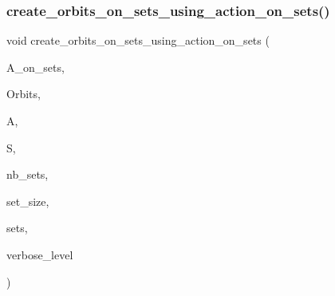 \subsubsection{\texorpdfstring{create\+\_\+orbits\+\_\+on\+\_\+sets\+\_\+using\+\_\+action\+\_\+on\+\_\+sets()}{create\_orbits\_on\_sets\_using\_action\_on\_sets()}}
{\footnotesize\ttfamily void create\+\_\+orbits\+\_\+on\+\_\+sets\+\_\+using\+\_\+action\+\_\+on\+\_\+sets (\begin{DoxyParamCaption}\item[{\mbox{\hyperlink{classaction}{action}} $\ast$\&}]{A\+\_\+on\+\_\+sets,  }\item[{\mbox{\hyperlink{classschreier}{schreier}} $\ast$\&}]{Orbits,  }\item[{\mbox{\hyperlink{classaction}{action}} $\ast$}]{A,  }\item[{\mbox{\hyperlink{classsims}{sims}} $\ast$}]{S,  }\item[{\mbox{\hyperlink{galois_8h_a09fddde158a3a20bd2dcadb609de11dc}{I\+NT}}}]{nb\+\_\+sets,  }\item[{\mbox{\hyperlink{galois_8h_a09fddde158a3a20bd2dcadb609de11dc}{I\+NT}}}]{set\+\_\+size,  }\item[{\mbox{\hyperlink{galois_8h_a09fddde158a3a20bd2dcadb609de11dc}{I\+NT}} $\ast$}]{sets,  }\item[{\mbox{\hyperlink{galois_8h_a09fddde158a3a20bd2dcadb609de11dc}{I\+NT}}}]{verbose\+\_\+level }\end{DoxyParamCaption})}

\mbox{\label{action__global_8_c_a086044bfe52cde7a37005c35fd5581cc}} 
